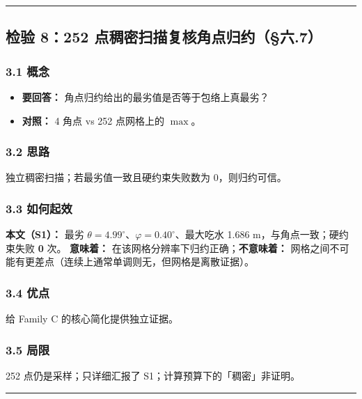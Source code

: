 \documentclass[UTF8,a4paper,zihao=-4]{ctexart}
\begin{document}
\vspace{0.4em}\hrule\vspace{0.4em}

\subsection{\texorpdfstring{检验 8：252 点稠密扫描复核角点归约（§六.7）}{检验 8：252 点稠密扫描复核角点归约（§六.7）}}

\subsubsection{\texorpdfstring{3.1 概念}{3.1 概念}}
\begin{itemize}[leftmargin=1.5em]
\item \textbf{要回答：} 角点归约给出的最劣值是否等于包络上真最劣？
\item \textbf{对照：} 4 角点 vs 252 点网格上的 \(\max\)。
\end{itemize}

\subsubsection{\texorpdfstring{3.2 思路}{3.2 思路}}
独立稠密扫描；若最劣值一致且硬约束失败数为 0，则归约可信。

\subsubsection{\texorpdfstring{3.3 如何起效}{3.3 如何起效}}
\textbf{本文（S1）：} 最劣 \(\theta=4.99^\circ\)、\(\varphi=0.40^\circ\)、最大吃水 1.686 m，与角点一致；硬约束失败 \textbf{0} 次。  
\textbf{意味着：} 在该网格分辨率下归约正确；\textbf{不意味着：} 网格之间不可能有更差点（连续上通常单调则无，但网格是离散证据）。

\subsubsection{\texorpdfstring{3.4 优点}{3.4 优点}}
给 Family C 的核心简化提供独立证据。

\subsubsection{\texorpdfstring{3.5 局限}{3.5 局限}}
252 点仍是采样；只详细汇报了 S1；计算预算下的「稠密」非证明。

\vspace{0.4em}\hrule\vspace{0.4em}
\end{document}
